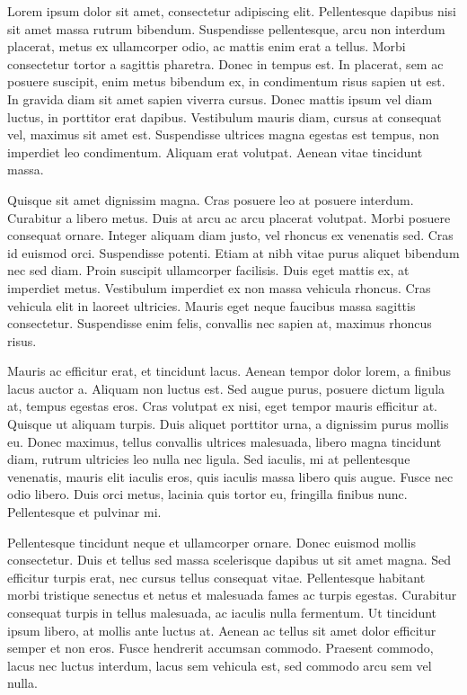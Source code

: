 Lorem ipsum dolor sit amet, consectetur adipiscing elit. Pellentesque dapibus nisi sit amet massa rutrum bibendum. Suspendisse pellentesque, arcu non interdum placerat, metus ex ullamcorper odio, ac mattis enim erat a tellus. Morbi consectetur tortor a sagittis pharetra. Donec in tempus est. In placerat, sem ac posuere suscipit, enim metus bibendum ex, in condimentum risus sapien ut est. In gravida diam sit amet sapien viverra cursus. Donec mattis ipsum vel diam luctus, in porttitor erat dapibus. Vestibulum mauris diam, cursus at consequat vel, maximus sit amet est. Suspendisse ultrices magna egestas est tempus, non imperdiet leo condimentum. Aliquam erat volutpat. Aenean vitae tincidunt massa.

Quisque sit amet dignissim magna. Cras posuere leo at posuere interdum. Curabitur a libero metus. Duis at arcu ac arcu placerat volutpat. Morbi posuere consequat ornare. Integer aliquam diam justo, vel rhoncus ex venenatis sed. Cras id euismod orci. Suspendisse potenti. Etiam at nibh vitae purus aliquet bibendum nec sed diam. Proin suscipit ullamcorper facilisis. Duis eget mattis ex, at imperdiet metus. Vestibulum imperdiet ex non massa vehicula rhoncus. Cras vehicula elit in laoreet ultricies. Mauris eget neque faucibus massa sagittis consectetur. Suspendisse enim felis, convallis nec sapien at, maximus rhoncus risus.

Mauris ac efficitur erat, et tincidunt lacus. Aenean tempor dolor lorem, a finibus lacus auctor a. Aliquam non luctus est. Sed augue purus, posuere dictum ligula at, tempus egestas eros. Cras volutpat ex nisi, eget tempor mauris efficitur at. Quisque ut aliquam turpis. Duis aliquet porttitor urna, a dignissim purus mollis eu. Donec maximus, tellus convallis ultrices malesuada, libero magna tincidunt diam, rutrum ultricies leo nulla nec ligula. Sed iaculis, mi at pellentesque venenatis, mauris elit iaculis eros, quis iaculis massa libero quis augue. Fusce nec odio libero. Duis orci metus, lacinia quis tortor eu, fringilla finibus nunc. Pellentesque et pulvinar mi.

Pellentesque tincidunt neque et ullamcorper ornare. Donec euismod mollis consectetur. Duis et tellus sed massa scelerisque dapibus ut sit amet magna. Sed efficitur turpis erat, nec cursus tellus consequat vitae. Pellentesque habitant morbi tristique senectus et netus et malesuada fames ac turpis egestas. Curabitur consequat turpis in tellus malesuada, ac iaculis nulla fermentum. Ut tincidunt ipsum libero, at mollis ante luctus at. Aenean ac tellus sit amet dolor efficitur semper et non eros. Fusce hendrerit accumsan commodo. Praesent commodo, lacus nec luctus interdum, lacus sem vehicula est, sed commodo arcu sem vel nulla.

